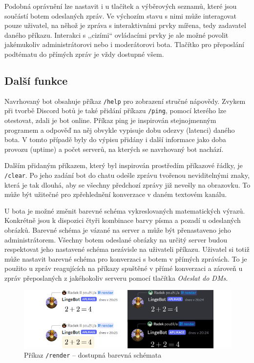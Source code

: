 \documentclass[FM]{tulthesis}
\begin{document}
	Podobná oprávnění lze nastavit i u tlačítek a výběrových seznamů, které jsou součástí botem odeslaných zpráv. Ve výchozím stavu s nimi může interagovat pouze uživatel, na něhož je zpráva s interaktivními prvky mířena, tedy zadavatel daného příkazu. Interakci s ,,cizími`` ovládacími prvky je ale možné povolit jakémukoliv administrátorovi nebo i moderátorovi bota. Tlačítko pro přeposlání podtématu do přímých zpráv je vždy dostupné všem.
	
	\subsection{Další funkce}
	
	Navrhovaný bot obsahuje příkaz \verb|/help| pro zobrazení stručné nápovědy. Zvykem při tvorbě Discord botů je také přidání příkazu \verb|/ping|, pomocí kterého lze otestovat, zdali je bot online. Příkaz ping je inspirován stejnojmenným programem a odpověď na něj obvykle vypisuje dobu odezvy (latenci) daného bota. V tomto případě byly do výpisu přidány i další informace jako doba provozu (uptime) a počet serverů, na kterých se navrhovaný bot nachází.
	
	Dalším přidaným příkazem, který byl inspirován prostředím příkazové řádky, je \verb|/clear|. Po jeho zadání bot do chatu odešle zprávu tvořenou neviditelnými znaky, která je tak dlouhá, aby se všechny předchozí zprávy již nevešly na obrazovku. To může být užitečné pro zpřehlednění konverzace v daném textovém kanálu.
	
	U bota je možné změnit barevné schéma vykreslovaných matematických výrazů. Konkrétně jsou k dispozici čtyři kombinace barvy písma a pozadí u odeslaných obrázků. Barevné schéma je vázané na server a může být přenastaveno jeho administrátorem. Všechny botem odeslané obrázky na určitý server budou respektovat jeho nastavené schéma nezávisle na uživateli příkazu. Uživatel si totiž může nastavit barevné schéma pro konverzaci s botem v přímých zprávách. To je použito u zpráv reagujících na příkazy spuštěné v přímé konverzaci a zároveň u zpráv přeposlaných z jakéhokoliv serveru pomocí tlačítka \textit{Odeslat do DMs}.
	
	\begin{figure}[ht]
		\centering
		\includegraphics[width=\textwidth]{img/5X/Themes}
		\caption{Příkaz \texttt{/render} – dostupná barevná schémata}
	\end{figure}
	
\end{document}
